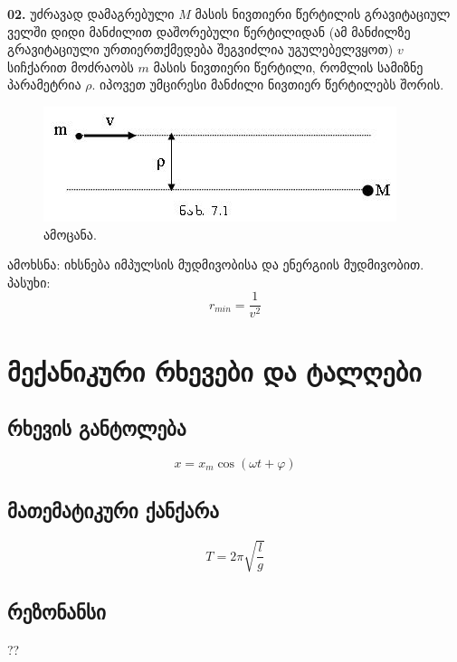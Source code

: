 \documentclass{book}
\begin{document}
\textbf{02.} უძრავად დამაგრებული $M$ მასის ნივთიერი წერტილის გრავიტაციულ ველში დიდი მანძილით დაშორებული წერტილიდან (ამ მანძილზე გრავიტაციული ურთიერთქმედება შეგვიძლია უგულებელვყოთ) $v$ სიჩქარით მოძრაობს $m$ მასის ნივთიერი წერტილი, რომლის სამიზნე პარამეტრია $\rho$. იპოვეთ უმცირესი მანძილი ნივთიერ წერტილებს შორის.
		\begin{figure}[h]
		   \centering
           \includegraphics[width=0.5\columnwidth]{figures/fig_1}
           \caption{ამოცანა.}
        \end{figure}
        
ამოხსნა:	იხსნება იმპულსის მუდმივობისა და ენერგიის მუდმივობით.\\
პასუხი: $$ r_{min} = \frac{1}{v^2} $$

\chapter{მექანიკური რხევები და ტალღები}
\section{რხევის განტოლება}
$$x=x_m\cos(\omega t + \varphi)$$
\section{მათემატიკური ქანქარა}

$$T = 2\pi \sqrt{\dfrac{l}{g}}$$

\section{რეზონანსი}
??
\end{document}
